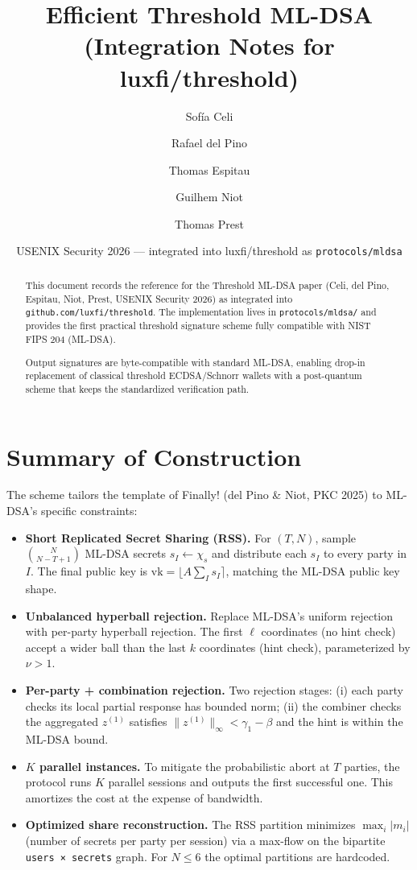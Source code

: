\documentclass[11pt]{article}
\title{Efficient Threshold ML-DSA\\ (Integration Notes for luxfi/threshold)}
\author{Sof\'ia Celi \and Rafael del Pino \and Thomas Espitau \and Guilhem Niot \and Thomas Prest}
\date{USENIX Security 2026 — integrated into luxfi/threshold as \texttt{protocols/mldsa}}
\begin{document}
\maketitle

\begin{abstract}
This document records the reference for the Threshold ML-DSA paper
(Celi, del Pino, Espitau, Niot, Prest, USENIX Security 2026) as integrated
into \texttt{github.com/luxfi/threshold}. The implementation lives in
\texttt{protocols/mldsa/} and provides the first practical threshold
signature scheme fully compatible with NIST FIPS 204 (ML-DSA).

Output signatures are byte-compatible with standard ML-DSA, enabling drop-in
replacement of classical threshold ECDSA/Schnorr wallets with a post-quantum
scheme that keeps the standardized verification path.
\end{abstract}

\section{Summary of Construction}

The scheme tailors the template of Finally! (del Pino \& Niot, PKC 2025) to
ML-DSA's specific constraints:

\begin{itemize}
  \item \textbf{Short Replicated Secret Sharing (RSS).} For $(T,N)$, sample
        $\binom{N}{N-T+1}$ ML-DSA secrets $s_I \leftarrow \chi_s$ and distribute
        each $s_I$ to every party in $I$. The final public key is
        $\mathrm{vk} = \lfloor A\sum_I s_I \rceil$, matching the ML-DSA public
        key shape.
  \item \textbf{Unbalanced hyperball rejection.} Replace ML-DSA's uniform
        rejection with per-party hyperball rejection. The first $\ell$
        coordinates (no hint check) accept a wider ball than the last $k$
        coordinates (hint check), parameterized by $\nu > 1$.
  \item \textbf{Per-party + combination rejection.} Two rejection stages:
        (i) each party checks its local partial response has bounded norm;
        (ii) the combiner checks the aggregated $z^{(1)}$ satisfies
        $\|z^{(1)}\|_\infty < \gamma_1 - \beta$ and the hint is within the
        ML-DSA bound.
  \item \textbf{$K$ parallel instances.} To mitigate the probabilistic abort
        at $T$ parties, the protocol runs $K$ parallel sessions and outputs
        the first successful one. This amortizes the cost at the expense of
        bandwidth.
  \item \textbf{Optimized share reconstruction.} The RSS partition minimizes
        $\max_i |m_i|$ (number of secrets per party per session) via a
        max-flow on the bipartite \texttt{users × secrets} graph.
        For $N \leq 6$ the optimal partitions are hardcoded.
\end{itemize}
\end{document}
